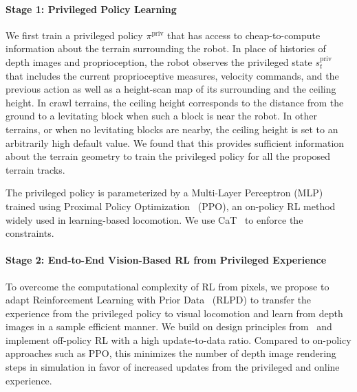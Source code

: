 \paragraph{Stage 1: Privileged Policy Learning}
We first train a privileged policy $\pi^\text{priv}$ that has access to cheap-to-compute information about the terrain surrounding the robot.
In place of histories of depth images and proprioception, the robot observes the privileged state $s_t^\text{priv}$ that includes the current proprioceptive measures, velocity commands, and the previous action as well as a height-scan map of its surrounding and the ceiling height.
In crawl terrains, the ceiling height corresponds to the distance from the ground to a levitating block when such a block is near the robot.
In other terrains, or when no levitating blocks are nearby, the ceiling height is set to an arbitrarily high default value.
We found that this provides sufficient information about the terrain geometry to train the privileged policy for all the proposed terrain tracks.

The privileged policy is parameterized by a Multi-Layer Perceptron (MLP) trained using Proximal Policy Optimization~\citep{schulman2017proximal} (PPO), an on-policy RL method widely used in learning-based locomotion. We use CaT~\citep{chane2024cat} to enforce the constraints.

\paragraph{Stage 2: End-to-End Vision-Based RL from Privileged Experience}
To overcome the computational complexity of RL from pixels, we propose to adapt Reinforcement Learning with Prior Data~\citep{ball2023efficient} (RLPD) to transfer the experience from the privileged policy to visual locomotion and learn from depth images in a sample efficient manner.
We build on design principles from~\citep{smith2022legged, ball2023efficient, smith2023learning} and implement off-policy RL with a high update-to-data ratio.
Compared to on-policy approaches such as PPO, this minimizes the number of depth image rendering steps in simulation in favor of increased updates from the privileged and online experience.

